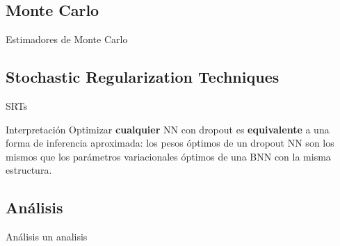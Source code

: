\subsection{Monte Carlo}

\begin{frame}{Estimadores de Monte Carlo}

    
    \vspace{10pt}
    
    
\end{frame}

\subsection{Stochastic Regularization Techniques}

\begin{frame}{SRTs}
     \begin{block}{Interpretación}
        Optimizar \textbf{cualquier} NN con dropout es \textbf{equivalente} a una forma de inferencia aproximada: los pesos óptimos de un dropout NN son los mismos que los parámetros variacionales óptimos de una BNN con la misma estructura.
    \end{block}
\end{frame}


\subsection{Análisis}

\begin{frame}{Análisis}
    un analisis
\end{frame}



